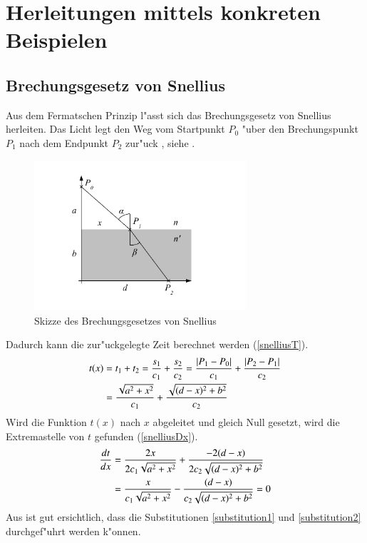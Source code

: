 \section{Herleitungen mittels konkreten Beispielen}
\subsection{Brechungsgesetz von Snellius \label{brechungsgesetz}}
Aus dem Fermatschen Prinzip l"asst sich das Brechungsgesetz von Snellius
herleiten.
Das Licht legt den Weg vom Startpunkt $P_0$ "uber den Brechungspunkt $P_1$ 
nach dem Endpunkt $P_2$ zur"uck \cite{Wikipedia}, siehe  .
\begin{figure}[h]
\begin{center}
	\includegraphics[width=0.7\textwidth]{licht/picture/Brechung.pdf}
	\caption{Skizze des Brechungsgesetzes von Snellius}
	\label{Ab:brechung}
\end{center}
\end{figure}
Dadurch kann die zur"uckgelegte Zeit berechnet werden (\eqref{snelliusT}).
\begin{align}
t(x) &= t_1 + t_2 = \frac{s_1}{c_1} + \frac{s_2}{c_2} = \frac{|P_1 - P_0|}{c_1} + \frac{|P_2 - P_1|}{c_2} \notag \\
&= \frac{\sqrt{a^2 + x^2}}{c_1} + \frac{\sqrt{(d-x)^2 + b^2}}{c_2} \label{snelliusT}
\end{align}
Wird die Funktion $t(x)$ nach $x$ abgeleitet und gleich Null gesetzt, wird die Extremastelle von $t$ gefunden (\eqref{snelliusDx}).
\begin{align}
	\frac{dt}{dx} &= \frac{2 x}{2  c_1  \sqrt{a^2 + x^2}} + \frac{-2  (d-x)}{2  c_2  \sqrt{(d-x)^2 + b^2}} \notag \\
	&= \frac{x}{c_1 \sqrt{a^2 + x^2}} - \frac{(d-x)}{c_2  \sqrt{(d-x)^2 + b^2}} = 0 
	\label{snelliusDx}
\end{align}
Aus  ist gut ersichtlich, dass die Substitutionen \ref{substitution1} und \ref{substitution2} durchgef"uhrt werden k"onnen.
